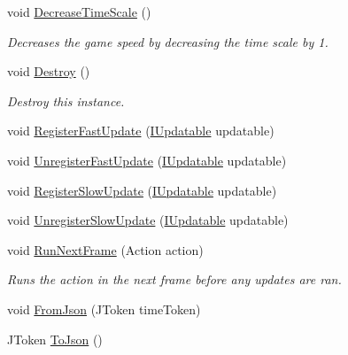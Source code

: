 \begin{DoxyCompactItemize}
void \hyperlink{class_time_manager_a23aecf449e33a25ab34cd685d95419f4}{Decrease\+Time\+Scale} ()
\begin{DoxyCompactList}\small\item\em Decreases the game speed by decreasing the time scale by 1. \end{DoxyCompactList}\item 
void \hyperlink{class_time_manager_a804d5557e6611976bcaf246c2ba2abc0}{Destroy} ()
\begin{DoxyCompactList}\small\item\em Destroy this instance. \end{DoxyCompactList}\item 
void \hyperlink{class_time_manager_add5fdf0eb0e02fcdeaf8f8b7f201093b}{Register\+Fast\+Update} (\hyperlink{interface_i_updatable}{I\+Updatable} updatable)
\item 
void \hyperlink{class_time_manager_ad7bb3e065a799ce4110c378d9681eac7}{Unregister\+Fast\+Update} (\hyperlink{interface_i_updatable}{I\+Updatable} updatable)
\item 
void \hyperlink{class_time_manager_a8220eefffab92503ad9f635419f00152}{Register\+Slow\+Update} (\hyperlink{interface_i_updatable}{I\+Updatable} updatable)
\item 
void \hyperlink{class_time_manager_a2b41968cd3169bfc3a7a232da307f57d}{Unregister\+Slow\+Update} (\hyperlink{interface_i_updatable}{I\+Updatable} updatable)
\item 
void \hyperlink{class_time_manager_a74ea70f67b4faec30bad59668dd0fb1e}{Run\+Next\+Frame} (Action action)
\begin{DoxyCompactList}\small\item\em Runs the action in the next frame before any updates are ran. \end{DoxyCompactList}\item 
void \hyperlink{class_time_manager_a3b14c9e855ae6faffeb22897f3a55caf}{From\+Json} (J\+Token time\+Token)
\item 
J\+Token \hyperlink{class_time_manager_ad65e1163a2aea49194d3fbad7a764403}{To\+Json} ()
\end{DoxyCompactItemize}
